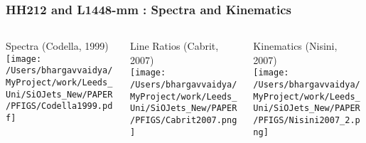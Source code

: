 \documentclass[8pt,xcolor=dvipsnames]{beamer}
\begin{document}
\begin{frame}[c]
\frametitle{HH212 and L1448-mm : Spectra and Kinematics}

\begin{columns}
 \begin{column}{0.33\textwidth}
Spectra (\alert{Codella, 1999})\\
 \texttt{[image: /Users/bhargavvaidya/MyProject/work/Leeds\_Uni/SiOJets\_New/PAPER/PFIGS/Codella1999.pdf]}

 \end{column}

 \begin{column}{0.33\textwidth}
Line Ratios (\alert{Cabrit, 2007})\\
 \texttt{[image: /Users/bhargavvaidya/MyProject/work/Leeds\_Uni/SiOJets\_New/PAPER/PFIGS/Cabrit2007.png]}

 \end{column}

\begin{column}{0.33\textwidth}
Kinematics (\alert{Nisini, 2007})\\
 \texttt{[image: /Users/bhargavvaidya/MyProject/work/Leeds\_Uni/SiOJets\_New/PAPER/PFIGS/Nisini2007\_2.png]}\\

 \end{column}
 \end{columns}
\vskip10pt



 \end{frame}
\end{document}
